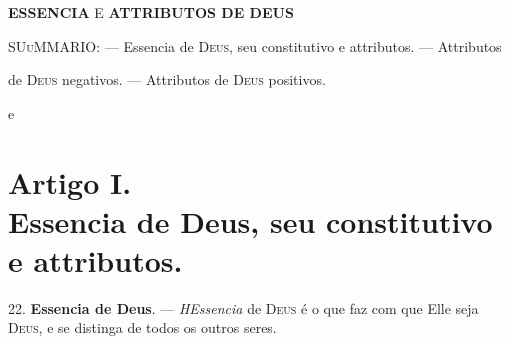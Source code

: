 



 \textbf{ESSENCIA} E \textbf{ATTRIBUTOS DE DEUS}

\textsc{SUuMMARIO}: --- Essencia de \textsc{Deus}, seu constitutivo e attributos. --- Attributos

de \textsc{Deus} negativos. --- Attributos de \textsc{Deus} positivos.

e


\section*{Artigo I.\\ Essencia de Deus, seu constitutivo e attributos.}

22. \textbf{Essencia de Deus}. --- \emph{HEssencia} de \textsc{Deus} é o que faz com que Elle seja \textsc{Deus}, e se distinga de todos os outros seres.

